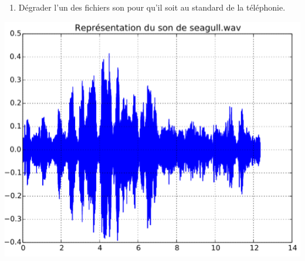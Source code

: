 \documentclass[10pt,fleqn]{article} %
\begin{document}
\begin{multicols}{2}
\begin{enumerate}[resume*]
\item 
  Dégrader l'un des fichiers son pour qu'il soit au standard de la
  téléphonie. 
\end{enumerate}

\vspace*{1cm}

\centerline{\includegraphics[width=\linewidth]{images/theme_son_2_fig_3}}

 \fi
%
%
%
%
%
%
%
%
%

\ifprof
\else
\end{multicols}
\fi
\end{document}
